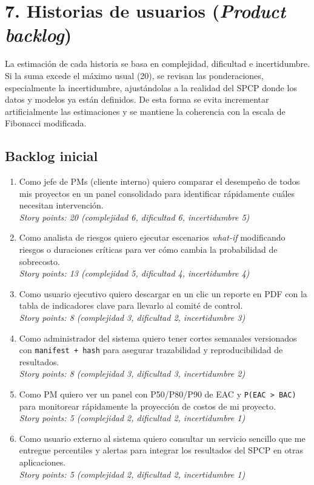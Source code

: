 \documentclass[12pt]
{charter}
\begin{document}
\section{7. Historias de usuarios (\textit{Product backlog})}
\label{sec:backlog}

La estimación de cada historia se basa en complejidad, dificultad e incertidumbre.
Si la suma excede el máximo usual (20), se revisan las ponderaciones, especialmente la incertidumbre, ajustándolas a la realidad del SPCP donde los datos y modelos ya están definidos.
De esta forma se evita incrementar artificialmente las estimaciones y se mantiene la coherencia con la escala de Fibonacci modificada.

\subsection{Backlog inicial}

  \begin{enumerate}
  \item Como jefe de PMs (cliente interno) quiero comparar el desempeño de todos mis proyectos en un panel consolidado para identificar rápidamente cuáles necesitan intervención.\\
  \textit{Story points: 20 (complejidad 6, dificultad 6, incertidumbre 5)}

  \item Como analista de riesgos quiero ejecutar escenarios \textit{what-if} modificando riesgos o duraciones críticas para ver cómo cambia la probabilidad de sobrecosto.\\
  \textit{Story points: 13 (complejidad 5, dificultad 4, incertidumbre 4)}

  \item Como usuario ejecutivo quiero descargar en un clic un reporte en PDF con la tabla de indicadores clave para llevarlo al comité de control.\\
  \textit{Story points: 8 (complejidad 3, dificultad 2, incertidumbre 3)}

  \item Como administrador del sistema quiero tener cortes semanales versionados con 
  \texttt{manifest + hash} para asegurar trazabilidad y reproducibilidad de resultados.\\
  \textit{Story points: 8 (complejidad 3, dificultad 3, incertidumbre 2)}

  \item Como PM quiero ver un panel con P50/P80/P90 de EAC y \texttt{P(EAC > BAC)} 
  para monitorear rápidamente la proyección de costos de mi proyecto.\\
  \textit{Story points: 5 (complejidad 2, dificultad 2, incertidumbre 1)}

  \item Como usuario externo al sistema quiero consultar un servicio sencillo que me entregue percentiles y alertas para integrar los resultados del SPCP en otras aplicaciones.\\
  \textit{Story points: 5 (complejidad 2, dificultad 2, incertidumbre 1)}

  \end{enumerate}
\end{document}
